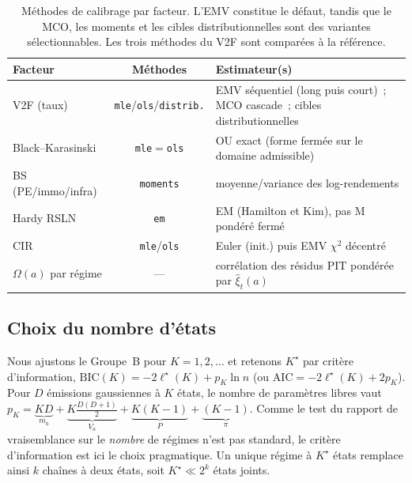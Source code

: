 \documentclass[11pt,a4paper]{article}
\theoremstyle{definition}
\begin{document}
\begin{table}[H]
\centering\small\renewcommand{\arraystretch}{1.3}
\begin{tabularx}{\textwidth}{@{}l c X@{}}
\toprule
\textbf{Facteur} & \textbf{Méthodes} & \textbf{Estimateur(s)}\\
\midrule
V2F (taux) & \texttt{mle}/\texttt{ols}/\texttt{distrib.} & EMV séquentiel (long puis court)~; MCO cascade~; cibles distributionnelles\\
Black--Karasinski & \texttt{mle}$=$\texttt{ols} & OU exact (forme fermée sur le domaine admissible)\\
BS (PE/immo/infra) & \texttt{moments} & moyenne/variance des log-rendements\\
Hardy RSLN & \texttt{em} & EM (Hamilton et Kim), pas M pondéré fermé\\
CIR & \texttt{mle}/\texttt{ols} & Euler (init.) puis EMV $\chi^2$ décentré\\
$\Omega(a)$ par régime & --- & corrélation des résidus PIT pondérée par $\hat\xi_t(a)$\\
\bottomrule
\end{tabularx}
\caption{Méthodes de calibrage par facteur. L'EMV constitue le défaut, tandis que le MCO, les moments et les cibles distributionnelles sont des variantes sélectionnables. Les trois méthodes du V2F sont comparées à la référence.}
\label{tab:closed}
\end{table}

\subsection{Choix du nombre d'états}
\label{sec:K}
Nous ajustons le Groupe~B pour $K=1,2,\dots$ et retenons $K^\star$ par critère d'information, $\mathrm{BIC}(K)=-2\ell^\star(K)+p_K\ln n$ (ou $\mathrm{AIC}=-2\ell^\star(K)+2p_K$). Pour $D$ émissions gaussiennes à $K$ états, le nombre de paramètres libres vaut $p_K=\underbrace{KD}_{m_a}+\underbrace{K\tfrac{D(D+1)}{2}}_{V_a}+\underbrace{K(K-1)}_{P}+\underbrace{(K-1)}_{\pi}$. Comme le test du rapport de vraisemblance sur le \emph{nombre} de régimes n'est pas standard, le critère d'information est ici le choix pragmatique. Un unique régime à $K^\star$ états remplace ainsi $k$ chaînes à deux états, soit $K^\star\ll2^k$ états joints.

\end{document}
